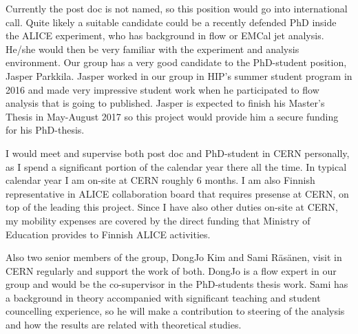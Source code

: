 Currently the post doc is not named, so this position would go into international call. Quite likely a suitable candidate could be a recently defended PhD inside the ALICE experiment, who has background in flow or EMCal jet analysis. He/she would then be very familiar with the experiment and analysis environment. Our group has a very good candidate to the PhD-student position, Jasper Parkkila. Jasper worked in our group in HIP's summer student program in 2016 and made very impressive student work when he participated to flow analysis that is going to published. Jasper is expected to finish his Master's Thesis in May-August 2017 so this project would provide him a secure funding for his PhD-thesis.

I would meet and supervise both post doc and PhD-student in CERN personally, as I spend a significant portion of the calendar year there all the time. In typical calendar year I am on-site at CERN roughly 6 months. I am also Finnish representative in ALICE collaboration board that requires presense at CERN, on top of the leading this project. Since I have also other duties on-site at CERN, my mobility expenses are covered by the direct funding that Ministry of Education provides to Finnish ALICE activities.

Also two senior members of the group, DongJo Kim and Sami R\"as\"anen, visit in CERN regularly and support the work of both. DongJo is a flow expert in our group and would be the co-supervisor in the PhD-students thesis work. Sami has a background in theory accompanied with significant teaching and student councelling experience, so he will make a contribution to steering of the analysis and how the results are related with theoretical studies.


\nopagebreak
